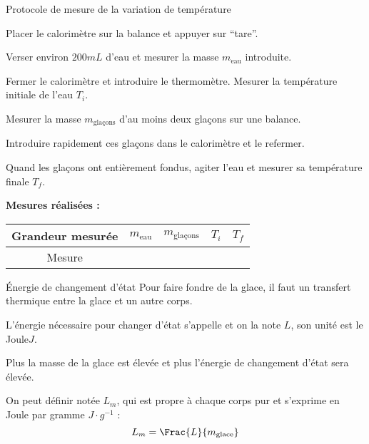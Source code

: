 \begin{doc}{Protocole de mesure de la variation de température}
  \label{doc:protocole_fusion_eau}
  \vspace*{-20pt}
  \begin{protocole}
    \item Placer le calorimètre sur la balance et appuyer sur ``tare''.
    \item Verser environ $200 \unit{mL}$ d'eau et mesurer la masse $m_\text{eau}$ introduite.
    \item Fermer le calorimètre et introduire le thermomètre. Mesurer la température initiale de l'eau $T_i$.
    \item Mesurer la masse $m_\text{glaçons}$ d'au moins deux glaçons sur une balance.
    \item Introduire rapidement ces glaçons dans le calorimètre et le refermer.
    \item Quand les glaçons ont entièrement fondus, agiter l'eau et mesurer sa température finale $T_f$.
  \end{protocole}
  
  \textbf{Mesures réalisées :}
  \begin{center}
    \newcommand{\tailleTableau}{\hspace{60pt}\phantom{$\Frac{1}{8}$}}
    \begin{tabular}{| c | c | c | c | c |}
      \hline
      \rowcolor{gray!20}
      Grandeur mesurée & $m_\text{eau}$ & $m_\text{glaçons}$ & $T_i$ & $T_f$ 
      \\ \hline
      Mesure & \tailleTableau & \tailleTableau & \tailleTableau & \tailleTableau
      \\ \hline
    \end{tabular}
  \end{center}
\end{doc}

\begin{doc}{Énergie de changement d'état}
  \label{doc:energie_changement_etat}
  Pour faire fondre de la glace, il faut un transfert thermique entre la glace et un autre corps.
  \begin{encart}
    L'énergie nécessaire pour changer d'état s'appelle  et on la note $L$, son unité est le Joule$\unit{J}$.
  \end{encart}
  Plus la masse de la glace est élevée et plus l'énergie de changement d'état sera élevée.
  
  \begin{encart}
    On peut définir  notée $L_m$, qui est propre à chaque corps pur et s'exprime en Joule par gramme  $\unit{J \cdot g^{-1}}$ :
    \begin{equation*}
      L_m = \Frac{L}{m_\text{glace}}
    \end{equation*}
  \end{encart}
\end{doc}


